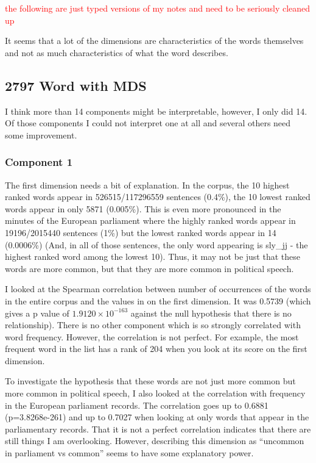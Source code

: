 \documentclass[10pt,letterpaper]{book}
\newcommand{\todo}[1]{\textcolor{red}{#1}}
\begin{document}
\todo{the following are just typed versions of my notes and need to be 
seriously cleaned up}

It seems that a lot of the dimensions are characteristics of the words 
themselves and not as much characteristics of what the word describes.

\subsection{2797 Word with MDS}

I think more than 14 components might be interpretable, however, I only did 14. 
Of those components I could not interpret one at all and several others need 
some improvement. 

\subsubsection{Component 1}

The first dimension needs a bit of explanation. In the corpus, the 10 highest 
ranked words appear in 526515/117296559 sentences (0.4\%), the 10 lowest 
ranked words appear in only 5871 (0.005\%). This is even more pronounced in the 
minutes of the European parliament where the highly ranked words appear in 
19196/2015440 sentences (1\%) but the lowest ranked words appear in 14 
(0.0006\%) (And, in all of those sentences, the only word appearing is 
sly\_jj - the highest ranked word among the lowest 10). Thus, it may not be 
just that these words are more common, but that they are more common in 
political speech.

I looked at the Spearman correlation between number of occurrences of the words 
in the entire corpus and the values in on the first dimension. It was 0.5739 
(which gives a p value of $1.9120 \times 10^{-163}$ against the null hypothesis 
that there is no relationship). There is no other component which is so 
strongly correlated with word frequency. However, the correlation is not 
perfect. For example, the most frequent word in the list has a rank of 204 when 
you look at its score on the first dimension.

To investigate the hypothesis that these words are not just more common but 
more common in political speech, I also looked at the correlation with 
frequency in the European parliament records. The correlation goes up to 0.6881 
(p=3.8268e-261) and up to 0.7027 when looking at only words that appear in the 
parliamentary records. That it is not a perfect correlation indicates that 
there are still things I am overlooking. However, describing this dimension as 
``uncommon in parliament vs common'' seems to have some explanatory power.
\end{document}
